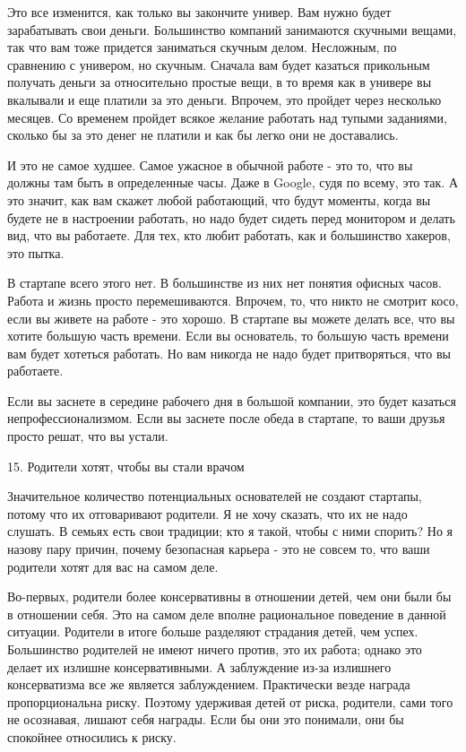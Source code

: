 \documentclass[ebook,12pt,oneside,openany]{memoir}
\begin{document}
Это все изменится, как только вы закончите универ. Вам нужно будет
зарабатывать свои деньги. Большинство компаний занимаются скучными
вещами, так что вам тоже придется заниматься скучным делом. Несложным,
по сравнению с универом, но скучным. Сначала вам будет казаться
прикольным получать деньги за относительно простые вещи, в то время
как в универе вы вкалывали и еще платили за это деньги. Впрочем, это
пройдет через несколько месяцев. Со временем пройдет всякое желание
работать над тупыми заданиями, сколько бы за это денег не платили и
как бы легко они не доставались.

И это не самое худшее. Самое ужасное в обычной работе - это то, что вы
должны там быть в определенные часы. Даже в Google, судя по всему, это
так. А это значит, как вам скажет любой работающий, что будут моменты,
когда вы будете не в настроении работать, но надо будет сидеть перед
монитором и делать вид, что вы работаете. Для тех, кто любит работать,
как и большинство хакеров, это пытка.

В стартапе всего этого нет. В большинстве из них нет понятия офисных
часов. Работа и жизнь просто перемешиваются. Впрочем, то, что никто не
смотрит косо, если вы живете на работе - это хорошо. В стартапе вы
можете делать все, что вы хотите большую часть времени. Если вы
основатель, то большую часть времени вам будет хотеться работать. Но
вам никогда не надо будет притворяться, что вы работаете.

Если вы заснете в середине рабочего дня в большой компании, это будет
казаться непрофессионализмом. Если вы заснете после обеда в стартапе,
то ваши друзья просто решат, что вы устали.

15. Родители хотят, чтобы вы стали врачом

Значительное количество потенциальных основателей не создают стартапы,
потому что их отговаривают родители. Я не хочу сказать, что их не надо
слушать. В семьях есть свои традиции; кто я такой, чтобы с ними
спорить? Но я назову пару причин, почему безопасная карьера - это не
совсем то, что ваши родители хотят для вас на самом деле.

Во-первых, родители более консервативны в отношении детей, чем они
были бы в отношении себя. Это на самом деле вполне рациональное
поведение в данной ситуации. Родители в итоге больше разделяют
страдания детей, чем успех. Большинство родителей не имеют ничего
против, это их работа; однако это делает их излишне консервативными. А
заблуждение из-за излишнего консерватизма все же является
заблуждением. Практически везде награда пропорциональна риску. Поэтому
удерживая детей от риска, родители, сами того не осознавая, лишают
себя награды. Если бы они это понимали, они бы спокойнее относились к
риску.
\end{document}
